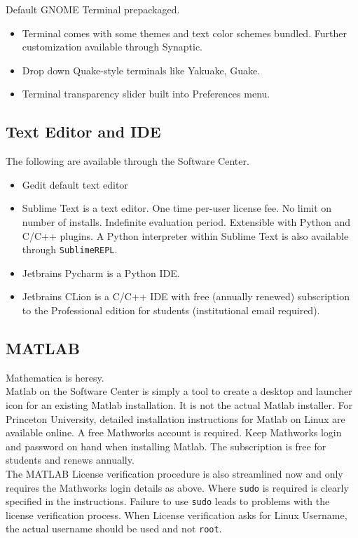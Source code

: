 \documentclass[10pt,letterpaper,twocolumn]{article}
\begin{document}
Default GNOME Terminal prepackaged.

\begin{itemize}
	\item Terminal comes with some themes and text color schemes bundled. Further customization available through Synaptic.
	\item Drop down Quake-style terminals like Yakuake, Guake.
	\item Terminal transparency slider built into Preferences menu.
\end{itemize}

\subsection{Text Editor and IDE}
The following are available through the Software Center.

\begin{itemize}
	\item Gedit default text editor
	\item Sublime Text is a text editor. One time per-user license fee. No limit on number of installs. Indefinite evaluation period. Extensible with Python and C/C++ plugins. A Python interpreter within Sublime Text is also available through \texttt{SublimeREPL}. 
	\item Jetbrains Pycharm is a Python IDE.
	\item Jetbrains CLion is a C/C++ IDE with free (annually renewed) subscription to the Professional edition for students (institutional email required).
\end{itemize}

\subsection{MATLAB}

Mathematica is heresy.\\

Matlab on the Software Center is simply a tool to create a desktop and launcher icon for an existing Matlab installation. It is not the actual Matlab installer.
For Princeton University, detailed installation instructions for Matlab on Linux are available online. A free Mathworks account is required. Keep Mathworks login and password on hand when installing Matlab. The subscription is free for students and renews annually.\\

The MATLAB License verification procedure is also streamlined now and only requires the Mathworks login details as above. Where \texttt{sudo} is required is clearly specified in the instructions. Failure to use \texttt{sudo} leads to problems with the license verification process. When License verification asks for Linux Username, the actual username should be used and not \texttt{root}.\\
\end{document}

